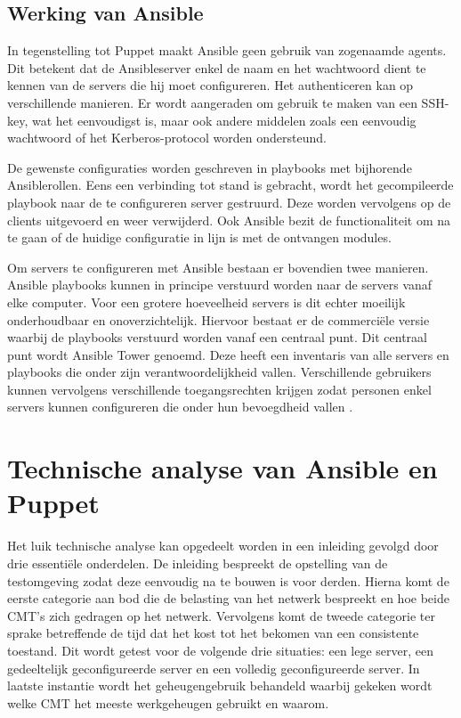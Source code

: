 \subsection{Werking van Ansible}

In tegenstelling tot Puppet maakt Ansible geen gebruik van zogenaamde agents. Dit betekent dat de Ansibleserver enkel de naam en het wachtwoord dient te kennen van de servers die hij moet configureren. Het authenticeren kan op verschillende manieren. Er wordt aangeraden om gebruik te maken van een SSH-key, wat het eenvoudigst is, maar ook andere middelen zoals een eenvoudig wachtwoord of het Kerberos-protocol worden ondersteund.

De gewenste configuraties worden geschreven in playbooks met bijhorende Ansiblerollen. Eens een verbinding tot stand is gebracht, wordt het gecompileerde playbook naar de te configureren server gestruurd. Deze worden vervolgens op de clients uitgevoerd  en weer verwijderd. Ook Ansible bezit de functionaliteit om na te gaan of de huidige configuratie in lijn is met de ontvangen modules. 

Om servers te configureren met Ansible bestaan er bovendien twee manieren. Ansible playbooks kunnen in principe verstuurd worden naar de servers vanaf elke computer. Voor een grotere hoeveelheid servers is dit echter moeilijk onderhoudbaar en onoverzichtelijk. Hiervoor bestaat er de commerci\"ele versie waarbij de playbooks verstuurd worden vanaf een centraal punt. Dit centraal punt wordt Ansible Tower genoemd. Deze heeft een inventaris van alle servers en playbooks die onder zijn verantwoordelijkheid vallen. Verschillende gebruikers kunnen vervolgens verschillende toegangsrechten krijgen zodat personen enkel servers kunnen configureren die onder hun bevoegdheid vallen \autocite{ansibledoc}.




\section{Technische analyse van Ansible en Puppet}
\label{sec:technischeanalyse}

Het luik technische analyse kan opgedeelt worden in een inleiding gevolgd door drie essenti\"ele onderdelen. De inleiding bespreekt de opstelling van de testomgeving zodat deze eenvoudig na te bouwen is voor derden. \newline
Hierna komt de eerste categorie aan bod die de belasting van het netwerk bespreekt  en hoe beide \gls{CMT}'s zich gedragen op het netwerk. \newline
Vervolgens komt de tweede categorie ter sprake betreffende de tijd dat het kost tot het bekomen van een consistente toestand. Dit wordt getest voor de volgende drie situaties: een lege server, een gedeeltelijk geconfigureerde server en een volledig geconfigureerde server.\newline
In laatste instantie wordt het geheugengebruik behandeld waarbij gekeken wordt welke \gls{CMT} het meeste werkgeheugen gebruikt en waarom.

